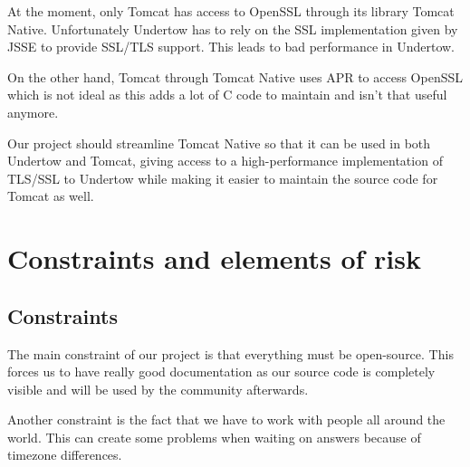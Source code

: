 \documentclass[11pt,a4paper,bibliography=totocnumbered]{scrartcl}
\begin{document}
At the moment, only Tomcat has access to OpenSSL through its library Tomcat Native. Unfortunately Undertow has to rely on the SSL implementation given by JSSE to provide SSL/TLS support. This leads to bad performance in Undertow.

On the other hand, Tomcat through Tomcat Native uses APR to access OpenSSL which is not ideal as this adds a lot of C code to maintain and isn't that useful anymore.

Our project should streamline Tomcat Native so that it can be used in both Undertow and Tomcat, giving access to a high-performance implementation of TLS/SSL to Undertow while making it easier to maintain the source code for  Tomcat as well.



\section{Constraints and elements of risk}

\subsection{Constraints}
\label{subsec:constraints}

The main constraint of our project is that everything must be open-source. This forces us to have really good documentation as our source code is completely visible and will be used by the community afterwards.

Another constraint is the fact that we have to work with people all around the world. This can create some problems when waiting on answers because of timezone differences.
\end{document}
